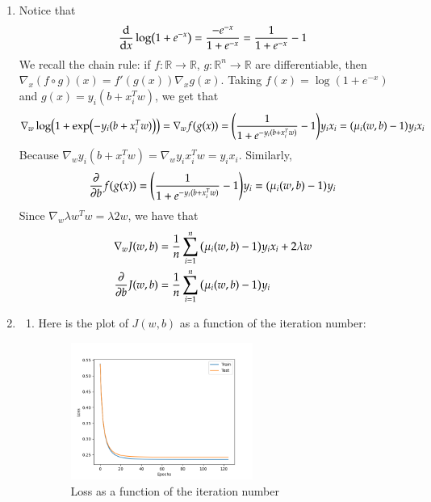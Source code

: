 \documentclass[12pt]{article}
\theoremstyle{definitionstyle}
\def\mbb#1{\mathbb{#1}}
\def \R{\mbb{R}}
\begin{document}
    \begin{enumerate}[label=\alph*.]
        \item Notice that
        \begin{align*}
            \dv{x} \log(1+e^{-x}) = \frac{-e^{-x}}{1+e^{-x}} = \frac{1}{1+e^{-x}}-1
        \end{align*}
        We recall the chain rule: if $f: \R \to \R$, $g: \R^n \to \R$ are differentiable, then $\nabla_x (f \circ g)(x) = f'(g(x)) \nabla_x g(x)$. Taking $f(x) = \log(1+e^{-x})$ and $g(x) = y_i(b+x_i^Tw)$, we get that
        \begin{align*}
            \nabla_w \log(1+\exp(-y_i(b+x_i^Tw))) = \nabla_w f(g(x)) = \qty(\frac{1}{1+e^{-y_i(b+x_i^Tw)}}-1) y_ix_i = (\mu_i(w,b) - 1)y_ix_i
        \end{align*}
        Because $\nabla_w y_i(b+x_i^Tw) = \nabla_w y_ix_i^Tw = y_ix_i$. Similarly, 
        \begin{align*}
            \pdv{b} f(g(x)) = \qty(\frac{1}{1+e^{-y_i(b+x_i^Tw)}}-1) y_i = (\mu_i(w,b)-1)y_i
        \end{align*}
        Since $\nabla_w \lambda w^Tw = \lambda 2w$, we have that
        \begin{align*}
            \nabla_w J(w,b) &= \frac1n\sum_{i=1}^n \qty(\mu_i(w,b)-1)y_ix_i + 2\lambda w \\
            \pdv{b} J(w,b) &= \frac1n\sum_{i=1}^n \qty(\mu_i(w,b)-1)y_i
        \end{align*}

        \item 
        \begin{enumerate}[label=(\roman*)]
            \item Here is the plot of $J(w,b)$ as a function of the iteration number:
            \begin{figure}[H]
                \centering
                \includegraphics[width=0.6\textwidth]{grad_descent_loss.png}
                \caption{Loss as a function of the iteration number}
            \end{figure}


\end{enumerate}
\end{enumerate}
\end{document}
